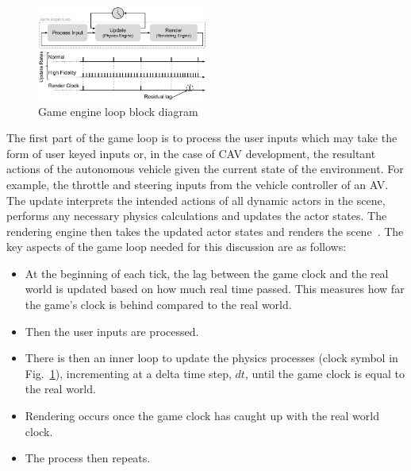 \documentclass[letterpaper, 10 pt, journal, twoside]{IEEEtran}
\begin{document}
\begin{figure}[h]
\centering
\includegraphics[width=0.5\textwidth]{Other/Figures/GameEngineLoop.pdf}
\caption{Game engine loop block diagram~\cite{GameProgPatternsBook}}
\label{GameEngineLoopDiagram}
\end{figure}
The first part of the game loop is to process the user inputs which may take the form of user keyed inputs or, in the case of CAV development, the resultant actions of the autonomous vehicle given the current state of the environment. For example, the throttle and steering inputs from the vehicle controller of an AV. The update interprets the intended actions of all dynamic actors in the scene, performs any necessary physics calculations and updates the actor states. The rendering engine then takes the updated actor states and renders the scene~\cite{GameProgPatternsBook}. 
% 
% 
The key aspects of the game loop needed for this discussion are as follows: 

\begin{itemize}[leftmargin=*]
    \item At the beginning of each tick, the lag between the game clock and the real world is updated based on how much real time passed. This measures how far the game's clock is behind compared to the real world.
    \item Then the user inputs are processed.
    \item There is then an inner loop to update the physics processes (clock symbol in Fig.~\ref{GameEngineLoopDiagram}), incrementing at a delta time step, $dt$, until the game clock is equal to the real world. 
    \item Rendering occurs once the game clock has caught up with the real world clock. 
    \item The process then repeats.
\end{itemize} 
\end{document}

